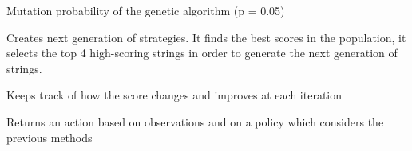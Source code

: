 \documentclass[letterpaper,10pt,english]{sphinxmanual}
\begin{document}
\begin{fulllineitems}
\begin{fulllineitems}
\end{fulllineitems}


\begin{fulllineitems}
\label{\detokenize{index:algorithms.genetic.genetic.set_mut_prob}}
Mutation probability of the genetic algorithm (p = 0.05)

\end{fulllineitems}


\begin{fulllineitems}
\label{\detokenize{index:algorithms.genetic.genetic.next_generation}}
Creates next generation of strategies. It finds the best scores in the population, it selects the top 4 high-scoring strings
in order to generate the next generation of strings.

\end{fulllineitems}


\begin{fulllineitems}
\label{\detokenize{index:algorithms.genetic.genetic.process_score}}
Keeps track of how the score changes and improves at each iteration

\end{fulllineitems}


\begin{fulllineitems}
\label{\detokenize{index:algorithms.genetic.genetic.get_action}}
Returns an action based on observations and on a policy which considers the previous methods

\end{fulllineitems}


\end{fulllineitems}
\end{document}
